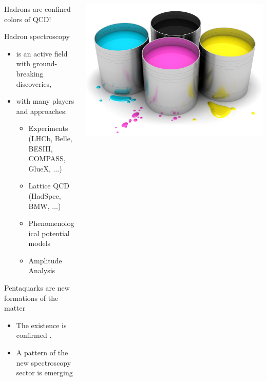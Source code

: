 \documentclass[aspectratio=169]{beamer}
\begin{document}
\begin{frame}[plain]{}{}
\begin{columns}
    \begin{column}{0.6\textwidth}
        {\Large \color{cola}
         Hadrons are confined colors of QCD!}
        \begin{exampleblock}{Hadron spectroscopy}
            \begin{itemize}
                \item is an active field with ground-breaking discoveries,
                \item with many players and approaches:
                \begin{itemize}
                    \item Experiments (LHCb, Belle, BESIII, COMPASS, GlueX, $\dots$)
                    \item Lattice QCD (HadSpec, BMW, $\dots$)
                    \item Phenomenological potential models
                    \item Amplitude Analysis
                \end{itemize}
            \end{itemize}
        \end{exampleblock}
        \begin{block}{Pentaquarks are new formations of the matter}
            \begin{itemize}
                \item The existence is confirmed .
                \item A pattern of the new spectroscopy sector is emerging
            \end{itemize}
        \end{block}
    \end{column}
    \begin{column}{0.38\textwidth}
        \includegraphics[width=\textwidth]{figs/buckets.jpg}
    \end{column}
\end{columns}
\end{frame}
\end{document}
